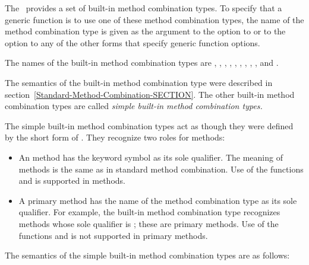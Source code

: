 The \CLOS\ provides a set of built-in method combination types.  To
specify that a generic function is to use one of these method
combination types, the name of the method combination type is given as
the argument to the  option to 
 or to the  option to any of the
other forms that specify generic function options.

The names of the built-in  method combination types are
\cdf{+}, , , , , , 
, , , and .

The semantics of the  built-in method combination type were
described in section~\ref{Standard-Method-Combination-SECTION}.  The other
built-in method combination types are called \emph{simple built-in method
combination types.}

The simple built-in method combination types act as though they were
defined by the short form of .  They
recognize two roles for methods:

\begin{itemize}

\item  An  method has the keyword symbol 
 as its sole qualifier.  The meaning of 
methods is the same as in standard method combination.  Use of the
functions  and  is supported
in  methods.

\item  A primary method has the name of the method combination
type as its sole qualifier.  For example, the built-in method
combination type  recognizes methods whose sole qualifier is
; these are primary methods. Use of the functions 
 and  is not supported in primary
methods.

\end{itemize}
The semantics of the simple built-in method combination types are as
follows:

